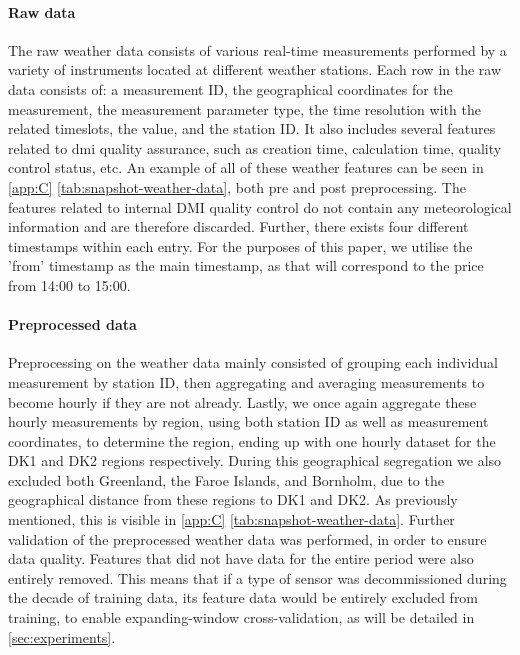 \paragraph{Raw data}
The raw weather data consists of various
real-time measurements performed by a variety of instruments located at 
different weather stations. Each row in the raw data consists of: a measurement 
ID, the geographical coordinates for the measurement, the measurement parameter 
type, the time resolution with the related timeslots, the value, and the 
station ID. It also includes several features related to \gls{dmi} quality 
assurance, such as creation time, calculation time,
quality control status, etc. An example of all of these weather features can be 
seen in \cref{app:C} 
\autoref{tab:snapshot-weather-data}, both pre and 
post preprocessing. The features 
related to internal DMI quality control do not 
contain any meteorological information and are 
therefore
discarded. Further, there exists four different timestamps within each entry. 
For the purposes of this paper, we utilise the 'from' timestamp as the main 
timestamp, as that will correspond to the price from 14:00 to 15:00.
\paragraph{Preprocessed data}
Preprocessing on the weather data mainly consisted of grouping each individual 
measurement by station ID, then aggregating and averaging measurements to
become hourly if they are not already. Lastly, we once again aggregate these 
hourly measurements by region, using both station ID as well as measurement 
coordinates, to determine the region, ending up with one hourly dataset for the 
DK1 and DK2 regions respectively. During this geographical segregation we
also excluded both Greenland, the Faroe Islands, and Bornholm,
due to the geographical distance from these regions to DK1 and
DK2. As previously mentioned, this is visible in 
\cref{app:C} \autoref{tab:snapshot-weather-data}. 
Further 
validation of the preprocessed weather data
was performed, in order to ensure data quality. Features that did
not have data for the entire period were also entirely removed.
This means that if a type of sensor was decommissioned during
the decade of training data, its feature data 
would be entirely
excluded from training, to enable expanding-window cross-validation, as will be 
detailed in \autoref{sec:experiments}.

